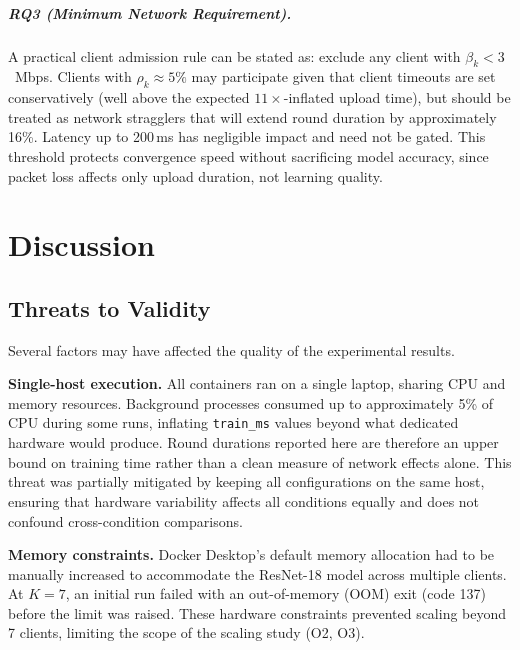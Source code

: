 \documentclass[12pt,a4paper]{report}
\begin{document}
\paragraph{RQ3 (Minimum Network Requirement).}  A practical client admission rule can be stated as: exclude any client
with $\beta_k < 3$~Mbps.  Clients with $\rho_k \approx 5\%$ may
participate given that client timeouts are set conservatively (well above
the expected $11\times$-inflated upload time), but should be treated as
network stragglers that will extend round duration by approximately 16\%.
Latency up to 200\,ms has negligible impact and need not be gated.  This
threshold protects convergence speed without sacrificing model accuracy,
since packet loss affects only upload duration, not learning quality.

\chapter{Discussion}
\label{ch:discussion}

\section{Threats to Validity}

Several factors may have affected the quality of the experimental results.

\textbf{Single-host execution.}
All containers ran on a single laptop, sharing CPU and memory resources.
Background processes consumed up to approximately 5\% of CPU during some
runs, inflating \texttt{train\_ms} values beyond what dedicated hardware
would produce.  Round durations reported here are therefore an upper bound
on training time rather than a clean measure of network effects alone.
This threat was partially mitigated by keeping all configurations on the
same host, ensuring that hardware variability affects all conditions equally
and does not confound cross-condition comparisons.

\textbf{Memory constraints.}
Docker Desktop's default memory allocation had to be manually increased to
accommodate the ResNet-18 model across multiple clients.  At $K = 7$, an
initial run failed with an out-of-memory (OOM) exit (code 137) before the
limit was raised.  These hardware constraints prevented scaling beyond 7
clients, limiting the scope of the scaling study (O2, O3).
\end{document}
